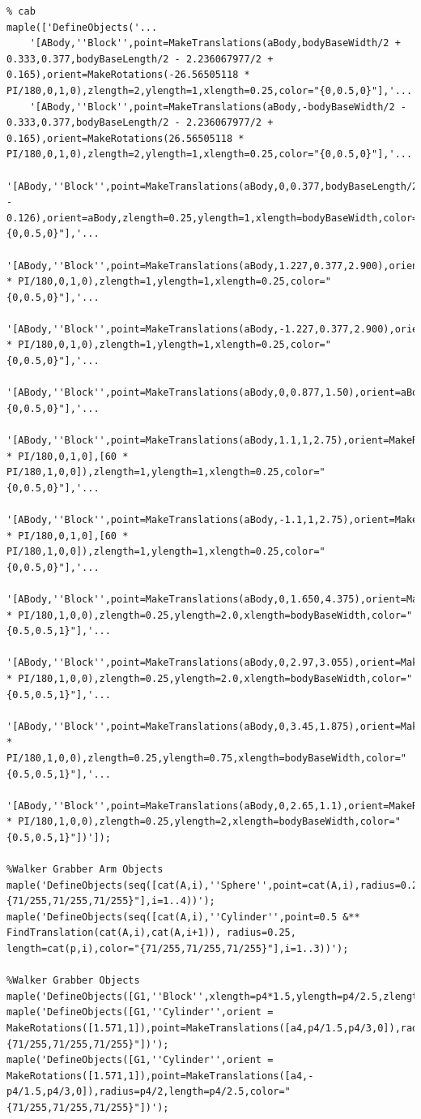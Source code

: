 \documentclass{article}
\begin{document}
\begin{verbatim}
% cab
maple(['DefineObjects('...
	'[ABody,''Block'',point=MakeTranslations(aBody,bodyBaseWidth/2 + 0.333,0.377,bodyBaseLength/2 - 2.236067977/2 + 0.165),orient=MakeRotations(-26.56505118 * PI/180,0,1,0),zlength=2,ylength=1,xlength=0.25,color="{0,0.5,0}"],'...
	'[ABody,''Block'',point=MakeTranslations(aBody,-bodyBaseWidth/2 - 0.333,0.377,bodyBaseLength/2 - 2.236067977/2 + 0.165),orient=MakeRotations(26.56505118 * PI/180,0,1,0),zlength=2,ylength=1,xlength=0.25,color="{0,0.5,0}"],'...
	'[ABody,''Block'',point=MakeTranslations(aBody,0,0.377,bodyBaseLength/2 - 0.126),orient=aBody,zlength=0.25,ylength=1,xlength=bodyBaseWidth,color="{0,0.5,0}"],'...
	'[ABody,''Block'',point=MakeTranslations(aBody,1.227,0.377,2.900),orient=MakeRotations(40 * PI/180,0,1,0),zlength=1,ylength=1,xlength=0.25,color="{0,0.5,0}"],'...
	'[ABody,''Block'',point=MakeTranslations(aBody,-1.227,0.377,2.900),orient=MakeRotations(-40 * PI/180,0,1,0),zlength=1,ylength=1,xlength=0.25,color="{0,0.5,0}"],'...
	'[ABody,''Block'',point=MakeTranslations(aBody,0,0.877,1.50),orient=aBody,zlength=2.5,ylength=2.0,xlength=2.0,color="{0,0.5,0}"],'...
	'[ABody,''Block'',point=MakeTranslations(aBody,1.1,1,2.75),orient=MakeRotations([40 * PI/180,0,1,0],[60 * PI/180,1,0,0]),zlength=1,ylength=1,xlength=0.25,color="{0,0.5,0}"],'...
	'[ABody,''Block'',point=MakeTranslations(aBody,-1.1,1,2.75),orient=MakeRotations([-40 * PI/180,0,1,0],[60 * PI/180,1,0,0]),zlength=1,ylength=1,xlength=0.25,color="{0,0.5,0}"],'...
	'[ABody,''Block'',point=MakeTranslations(aBody,0,1.650,4.375),orient=MakeRotations(-30 * PI/180,1,0,0),zlength=0.25,ylength=2.0,xlength=bodyBaseWidth,color="{0.5,0.5,1}"],'...
	'[ABody,''Block'',point=MakeTranslations(aBody,0,2.97,3.055),orient=MakeRotations(-60 * PI/180,1,0,0),zlength=0.25,ylength=2.0,xlength=bodyBaseWidth,color="{0.5,0.5,1}"],'...
	'[ABody,''Block'',point=MakeTranslations(aBody,0,3.45,1.875),orient=MakeRotations(90 * PI/180,1,0,0),zlength=0.25,ylength=0.75,xlength=bodyBaseWidth,color="{0.5,0.5,1}"],'...
	'[ABody,''Block'',point=MakeTranslations(aBody,0,2.65,1.1),orient=MakeRotations(30 * PI/180,1,0,0),zlength=0.25,ylength=2,xlength=bodyBaseWidth,color="{0.5,0.5,1}"])']);

%Walker Grabber Arm Objects
maple('DefineObjects(seq([cat(A,i),''Sphere'',point=cat(A,i),radius=0.25,color="{71/255,71/255,71/255}"],i=1..4))');
maple('DefineObjects(seq([cat(A,i),''Cylinder'',point=0.5 &** FindTranslation(cat(A,i),cat(A,i+1)), radius=0.25, length=cat(p,i),color="{71/255,71/255,71/255}"],i=1..3))');

%Walker Grabber Objects
maple('DefineObjects([G1,''Block'',xlength=p4*1.5,ylength=p4/2.5,zlength=p4*2,color=yellow])');
maple('DefineObjects([G1,''Cylinder'',orient = MakeRotations([1.571,1]),point=MakeTranslations([a4,p4/1.5,p4/3,0]),radius=p4/2,length=p4/2.5,color="{71/255,71/255,71/255}"])');
maple('DefineObjects([G1,''Cylinder'',orient = MakeRotations([1.571,1]),point=MakeTranslations([a4,-p4/1.5,p4/3,0]),radius=p4/2,length=p4/2.5,color="{71/255,71/255,71/255}"])');



\end{verbatim}
\end{document}
